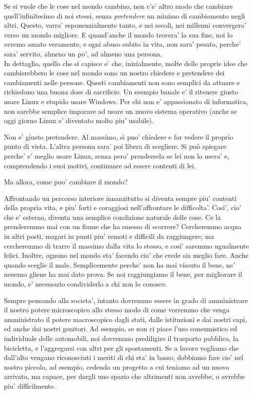 Se si vuole che le cose nel mondo cambino, non c'e' altro modo che cambiare quell'infinitesimo di noi stessi, senza \emph{pretendere} un minimo di cambiamento negli altri. Questo, varra' esponenzialmente tanto, e nei secoli, nei millenni convergera' verso un mondo migliore. E quand'anche il mondo trovera' la sua fine, noi lo avremo amato veramente, e ogni abuso subito in vita, non sara' pesato, perche' sara' servito, almeno un po', ad almeno una persona.\\

In dettaglio, quello che si capisce e' che, inizialmente, molte delle proprie idee che cambierebbero le cose nel mondo sono un nostro chiedere e pretendere dei cambiamenti nelle persone. Questi cambiamenti non sono semplici da attuare e richiedono una buona dose di sacrificio. Un esempio banale e' il ritenere giusto usare Linux e stupido usare Windows. Per chi non e' appassionato di informatica, non sarebbe semplice imparare ad usare un nuovo sistema operativo (anche se oggi giorno Linux e' diventato molto piu' usabile).

Non e' giusto pretendere. Al massimo, si puo' chiedere e far vedere il proprio punto di vista. L'altra persona sara' poi libera di scegliere. Si può spiegare perche' e' meglio usare Linux, senza pero' prendersela se lei non lo usera' e, comprendendo i suoi motivi, continuare ad essere contenti di lei.

Ma allora, come puo' cambiare il mondo?

Affrontando un percorso interiore innanzitutto si diventa sempre piu' contenti della propria vita, e piu' forti e coraggiosi nell'affrontare le difficolta'. Cosi', cio' che e' esterno, diventa una semplice condizione naturale delle cose. Ce la prenderemmo mai con un fiume che ha smesso di scorrere? Cercheremmo acqua in altri posti, magari in punti piu' remoti e difficili da raggiungere, ma cercheremmo di trarre il massimo dalla vita lo stesso, e cosi' saremmo ugualmente felici. 
Inoltre, ognuno nel mondo sta' facendo cio' che crede sia meglio fare. Anche quando sceglie il male. Semplicemente perche' non ha mai vissuto il bene, ne' nessuno gliene ha mai dato prova. 
Se noi raggiungiamo il bene, per migliorare il mondo, e' necessario condividerlo a chi non lo conosce.

Sempre pensando alla societa', intanto dovremmo essere in grado di amministrare il nostro potere microscopico allo stesso modo di come vorremmo che venga amministrato il potere macroscopico dagli stati, dalle istituzioni e dai nostri capi, ed anche dai nostri genitori.
Ad esempio, se non ci piace l'uso consumistico ed individuale delle automobili, noi dovremmo prediligire il trasporto pubblico, la bicicletta, e l'aggregarsi con altri per gli spostamenti.
Se a lavoro vogliamo che dall'alto vengano riconosciuti i meriti di chi sta' in basso, dobbiamo fare cio' nel nostro piccolo, ad esempio, cedendo un progetto a cui teniamo ad un nuovo arrivato, ma capace, per dargli uno spazio che altrimenti non avrebbe, o avrebbe piu' difficilmente.

